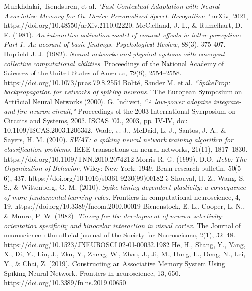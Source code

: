 \begin{thebibliography}{99}
	Munkhdalai, Tsendsuren, et al. \emph{"Fast Contextual Adaptation with Neural Associative Memory for On-Device Personalized Speech Recognition."} arXiv, 2021, https://doi.org/10.48550/arXiv.2110.02220.
	McClelland, J. L., \& Rumelhart, D. E. (1981). \emph{An interactive activation model of context effects in letter perception: Part 1. An account of basic findings. Psychological Review}, 88(3), 375-407.
	Hopfield J. J. (1982). \emph{Neural networks and physical systems with emergent collective computational abilities.} Proceedings of the National Academy of Sciences of the United States of America, 79(8), 2554–2558. https://doi.org/10.1073/pnas.79.8.2554
	Bohté, Sander M. et al. \emph{“SpikeProp: backpropagation for networks of spiking neurons.”} The European Symposium on Artificial Neural Networks (2000).
	G. Indiveri, \emph{“A low-power adaptive integrate-and-fire neuron circuit,"} Proceedings of the 2003 International Symposium on Circuits and Systems, 2003. ISCAS '03., 2003, pp. IV-IV, doi: 10.1109/ISCAS.2003.1206342.
	Wade, J. J., McDaid, L. J., Santos, J. A., \& Sayers, H. M. (2010). \emph{SWAT: a spiking neural network training algorithm for classification problems.} IEEE transactions on neural networks, 21(11), 1817–1830. https://doi.org/10.1109/TNN.2010.2074212
	Morris R. G. (1999). D.O. \emph{Hebb: The Organization of Behavior,} Wiley: New York; 1949. Brain research bulletin, 50(5-6), 437. https://doi.org/10.1016/s0361-9230(99)00182-3
	Shouval, H. Z., Wang, S. S., \& Wittenberg, G. M. (2010). \emph{Spike timing dependent plasticity: a consequence of more fundamental learning rules.} Frontiers in computational neuroscience, 4, 19. https://doi.org/10.3389/fncom.2010.00019
	Bienenstock, E. L., Cooper, L. N., \& Munro, P. W. (1982). \emph{Theory for the development of neuron selectivity: orientation specificity and binocular interaction in visual cortex.} The Journal of neuroscience : the official journal of the Society for Neuroscience, 2(1), 32–48. https://doi.org/10.1523/JNEUROSCI.02-01-00032.1982
	He, H., Shang, Y., Yang, X., Di, Y., Lin, J., Zhu, Y., Zheng, W., Zhao, J., Ji, M., Dong, L., Deng, N., Lei, Y., \& Chai, Z. (2019). Constructing an Associative Memory System Using Spiking Neural Network. Frontiers in neuroscience, 13, 650. https://doi.org/10.3389/fnins.2019.00650

\end{thebibliography}
